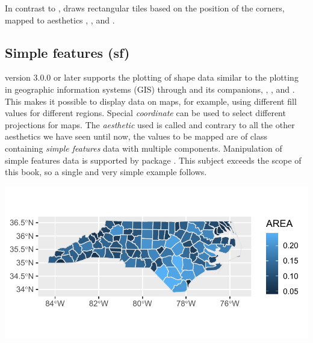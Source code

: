 \documentclass[krantz2]{krantz}\usepackage{knitr}
\begin{document}
In contrast to ,  draws rectangular tiles based on the position of the corners, mapped to aesthetics , ,  and .


\subsection{Simple features (sf)}\label{sec:plot:sf}

\ggplot version 3.0.0 or later supports the plotting of shape data similar to the plotting in geographic information systems (GIS) through  and its companions, , , and . This makes it possible to display data on maps, for example, using different fill values for different regions. Special \emph{coordinate}  can be used to select different projections for maps. The \emph{aesthetic} used is called  and contrary to all the other aesthetics we have seen until now, the values to be mapped are of class  containing \emph{simple features} data with multiple components. Manipulation of simple features data is supported by package . This subject exceeds the scope of this book, so a single and very simple example follows.

\begin{knitrout}\footnotesize
{}\color{fgcolor}\begin{kframe}
\begin{alltt}
 \hlkwb{<-} \hlopt{::}\hlstd{(}\hlstd{(}\hlstd{,}  \hlstd{=} \hlstd{),}  \hlstd{=} \hlstd{)}
 \hlopt{+}
  \hlstd{(}\hlstd{(}   \hlstd{=} \hlstd{)}
\end{alltt}
\end{kframe}

{\centering \includegraphics[width=.7\textwidth]{figure/pos-sf_plot-01-1}

}



\end{knitrout}
\end{document}

